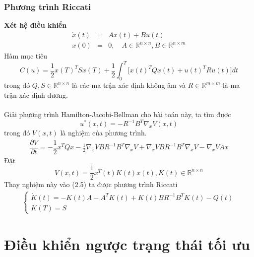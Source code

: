 \documentclass[12pt,a4paper]{report}
\begin{document}
\subsection{Phương trình Riccati}
\textbf{Xét hệ điều khiển}
\begin{eqnarray}
	\dot{x}(t) &=& Ax(t) + Bu(t) \nonumber\\ x(0) &=& 0, \quad A \in \mathbb{R}^{n\times n}, B \in \mathbb{R}^{n\times m} \nonumber
\end{eqnarray} Hàm mục tiêu $$C(u) = \dfrac{1}{2}x(T)^TSx(T) + \dfrac{1}{2}\int_{0}^{T}\Big[x(t)^TQx(t) + u(t)^TRu(t)\Big]dt$$ trong đó $Q, S \in \mathbb{R}^{n\times n}$ là các ma trận xác định không âm và $R \in \mathbb{R}^{m\times m}$ là ma trận xác định dương.\\\\ Giải phương trình Hamilton-Jacobi-Bellman cho bài toán này, ta tìm được $$u^*(x, t) = -R^{-1}B^T\nabla_xV(x, t)$$ trong đó $V(x, t)$ là nghiệm của phương trình.
\begin{eqnarray}
	\dfrac{\partial V}{\partial t} = -\dfrac{1}{2}x^TQx - \frac{1}{2}\nabla_xVBR^{-1}B^T\nabla_xV + \nabla_xVBR^{-1}B^T\nabla_xV - \nabla_xVAx
\end{eqnarray}
Đặt  $$V(x, t) = \dfrac{1}{2}x^T(t)K(t)x(t),  K(t) \in \mathbb{R}^{n\times n}$$ Thay nghiệm này vào (2.5) ta được phương trình Riccati
\begin{eqnarray}
	\begin{cases}
	\dot{K}(t) = -K(t)A - A^TK(t) + K(t)BR^{-1}B^TK(t) - Q(t) \\ K(T) = S
	\end{cases}
\end{eqnarray}
	\chapter{Điều khiển ngược trạng thái tối ưu}
\end{document}
